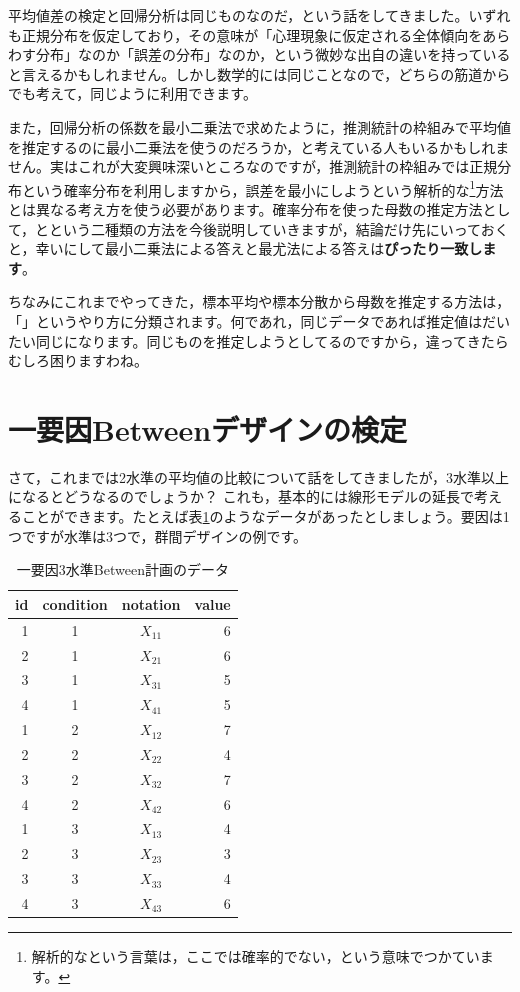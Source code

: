 \documentclass{ltjbook}
\begin{document}
平均値差の検定と回帰分析は同じものなのだ，という話をしてきました。いずれも正規分布を仮定しており，その意味が「心理現象に仮定される全体傾向をあらわす分布」なのか「誤差の分布」なのか，という微妙な出自の違いを持っていると言えるかもしれません。しかし数学的には同じことなので，どちらの筋道からでも考えて，同じように利用できます。

また，回帰分析の係数を最小二乗法で求めたように，推測統計の枠組みで平均値を推定するのに最小二乗法を使うのだろうか，と考えている人もいるかもしれません。実はこれが大変興味深いところなのですが，推測統計の枠組みでは正規分布という確率分布を利用しますから，誤差を最小にしようという解析的な\footnote{解析的なという言葉は，ここでは確率的でない，という意味でつかています。}方法とは異なる考え方を使う必要があります。確率分布を使った母数の推定方法として，とという二種類の方法を今後説明していきますが，結論だけ先にいっておくと，幸いにして最小二乗法による答えと最尤法による答えは\textbf{ぴったり一致します}。

ちなみにこれまでやってきた，標本平均や標本分散から母数を推定する方法は，「」というやり方に分類されます。何であれ，同じデータであれば推定値はだいたい同じになります。同じものを推定しようとしてるのですから，違ってきたらむしろ困りますわね。

\section{一要因Betweenデザインの検定}
さて，これまでは2水準の平均値の比較について話をしてきましたが，3水準以上になるとどうなるのでしょうか？
これも，基本的には線形モデルの延長で考えることができます。たとえば表\ref{table::21_02}のようなデータがあったとしましょう。要因は1つですが水準は3つで，群間デザインの例です。
\begin{table}[ht]
	\centering
	\caption{一要因3水準Between計画のデータ}
	\begin{tabular}{rccr}
		\hline
		id & condition & notation & value \\
		\hline
		1  & 1         & $X_{11}$ & 6     \\
		2  & 1         & $X_{21}$ & 6     \\
		3  & 1         & $X_{31}$ & 5     \\
		4  & 1         & $X_{41}$ & 5     \\
		1  & 2         & $X_{12}$ & 7     \\
		2  & 2         & $X_{22}$ & 4     \\
		3  & 2         & $X_{32}$ & 7     \\
		4  & 2         & $X_{42}$ & 6     \\
		1  & 3         & $X_{13}$ & 4     \\
		2  & 3         & $X_{23}$ & 3     \\
		3  & 3         & $X_{33}$ & 4     \\
		4  & 3         & $X_{43}$ & 6     \\
		\hline
	\end{tabular}
	\label{table::21_02}
\end{table}
\end{document}
